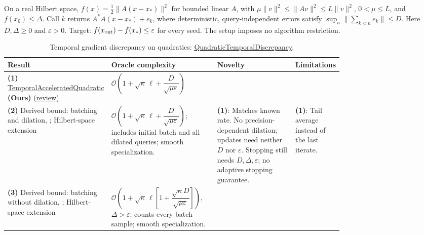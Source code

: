 \begin{table}[tp]
\centering
\caption{Temporal gradient discrepancy on quadratics: \href{https://github.com/k3nfalt/longtails/blob/main/LongTails/Setups/QuadraticTemporalDiscrepancy.lean}{QuadraticTemporalDiscrepancy}.}\label{tab:QuadraticTemporalDiscrepancy}
\parbox{\linewidth}{\footnotesize On a real Hilbert space, $f(x)=\tfrac12\|A(x-x_*)\|^2$ for bounded linear $A$, with $\mu\|v\|^2\le\|Av\|^2\le L\|v\|^2$, $0<\mu\le L$, and $f(x_0)\le\Delta$. Call $k$ returns $A^*A(x-x_*)+e_k$, where deterministic, query-independent errors satisfy $\sup_n\|\sum_{k<n}e_k\|\le D$. Here $D,\Delta\ge0$ and $\varepsilon>0$. Target: $f(x_{\rm out})-f(x_*)\le\varepsilon$ for every seed. The setup imposes no algorithm restriction.}\par\smallskip
\begin{threeparttable}
\footnotesize
\setlength{\tabcolsep}{4pt}\renewcommand{\arraystretch}{1.25}
\begin{tabularx}{\linewidth}{@{}>{\raggedright\arraybackslash}p{0.20\linewidth}>{\raggedright\arraybackslash}p{0.32\linewidth}>{\raggedright\arraybackslash}p{0.25\linewidth}>{\raggedright\arraybackslash}X@{}}
\toprule
\textbf{Result} & \textbf{Oracle complexity} & \textbf{Novelty} & \textbf{Limitations} \\
\midrule
\textbf{(1)} \href{https://github.com/k3nfalt/longtails/blob/main/LongTails/Theorems/TemporalAcceleratedQuadratic.lean}{Temporal\allowbreak{}Accelerated\allowbreak{}Quadratic} \textbf{(Ours)} \href{https://github.com/k3nfalt/longtails/blob/main/scripts/reviews/TemporalAcceleratedQuadratic.md}{(review)}
& $\mathcal{O}\!\left(1+\sqrt{\kappa}\,\ell+\dfrac{D}{\sqrt{\mu\varepsilon}}\right)$
& & \\
\midrule[1.2pt]
\textbf{(2)} Derived bound: batching and dilation, \citep[Prop.~4, v2]{hltSchmidt2011v2}; Hilbert-space extension
& $\mathcal{O}\!\left(1+\sqrt{\kappa}\,\ell+\dfrac{D}{\sqrt{\mu\varepsilon}}\right)$; includes initial batch and all dilated queries; smooth specialization.
& \textbf{(1)}: Matches known rate. No precision-dependent dilation; updates need neither $D$ nor $\varepsilon$. Stopping still needs $D,\Delta,\varepsilon$; no adaptive stopping guarantee.
& \textbf{(1)}: Tail average instead of the last iterate. \\
\midrule
\textbf{(3)} Derived bound: batching without dilation, \citep[Prop.~4, v2]{hltSchmidt2011v2}; Hilbert-space extension
& $\mathcal{O}\!\left(1+\sqrt{\kappa}\,\ell\left[1+\dfrac{\sqrt{\kappa}D}{\sqrt{\mu\varepsilon}}\right]\right)$, $\Delta>\varepsilon$; counts every batch sample; smooth specialization.

\end{tabularx}
\end{threeparttable}
\end{table}
